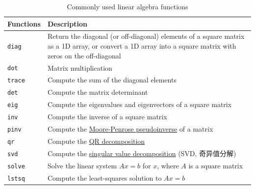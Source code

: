 \begin{table}
    \caption{Commonly used linear algebra functions}
    \label{Commonly used linear algebra functions}
    \begin{tabularx}{\textwidth}{lX}
        \hline
        Functions    & Description                                                                                                                                                \\
        \hline
        \verb|diag|  & Return the diagonal (or off-diagonal) elements of a square matrix as a 1D array, or convert a 1D array into a square matrix with zeros on the off-diagonal \\
        \verb|dot|   & Matrix multiplication                                                                                                                                      \\
        \verb|trace| & Compute the sum of the diagonal elements                                                                                                                   \\
        \verb|det|   & Compute the matrix determinant                                                                                                                             \\
        \verb|eig|   & Compute the eigenvalues and eigenvectors of a square matrix                                                                                                \\
        \verb|inv|   & Compute the inverse of a square matrix                                                                                                                     \\
        \verb|pinv|  & Compute the \href{https://en.wikipedia.org/wiki/Moore-Penrose_inverse}{Moore-Penrose pseudoinverse} of a matrix                                                                                                        \\
        \verb|qr|    & Compute the \href{https://en.wikipedia.org/wiki/QR_decomposition}{QR decomposition}                                                                                                                               \\
        \verb|svd|   & Compute the \href{https://en.wikipedia.org/wiki/Singular_value_decomposition}{singular value decomposition} (SVD, 奇异值分解)                                                                                                             \\
        \verb|solve| & Solve the linear system $Ax = b$ for $x$, where $A$ is a square matrix                                                                                     \\
        \verb|lstsq| & Compute the least-squares solution to $Ax = b$                                                                                                             \\
        \hline
    \end{tabularx}
\end{table}

